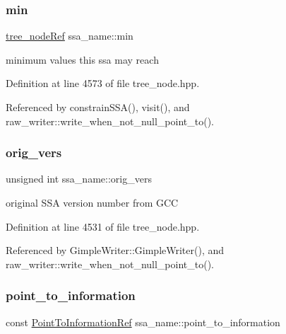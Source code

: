 \subsubsection{\texorpdfstring{min}{min}}
{\footnotesize\ttfamily \hyperlink{tree__node_8hpp_a6ee377554d1c4871ad66a337eaa67fd5}{tree\+\_\+node\+Ref} ssa\+\_\+name\+::min}



minimum values this ssa may reach 



Definition at line 4573 of file tree\+\_\+node.\+hpp.



Referenced by constrain\+S\+S\+A(), visit(), and raw\+\_\+writer\+::write\+\_\+when\+\_\+not\+\_\+null\+\_\+point\+\_\+to().

\mbox{\label{structssa__name_a5921a9a9eb6d6718609fe3bfb47a6304}} 
\subsubsection{\texorpdfstring{orig\+\_\+vers}{orig\_vers}}
{\footnotesize\ttfamily unsigned int ssa\+\_\+name\+::orig\+\_\+vers}



original S\+SA version number from G\+CC 



Definition at line 4531 of file tree\+\_\+node.\+hpp.



Referenced by Gimple\+Writer\+::\+Gimple\+Writer(), and raw\+\_\+writer\+::write\+\_\+when\+\_\+not\+\_\+null\+\_\+point\+\_\+to().

\mbox{\label{structssa__name_a8018a330033bc303b2de6fd0c9e29d87}} 
\subsubsection{\texorpdfstring{point\+\_\+to\+\_\+information}{point\_to\_information}}
{\footnotesize\ttfamily const \hyperlink{tree__node_8hpp_aa7470417b67a13b20fb980e600e55d8d}{Point\+To\+Information\+Ref} ssa\+\_\+name\+::point\+\_\+to\+\_\+information}



